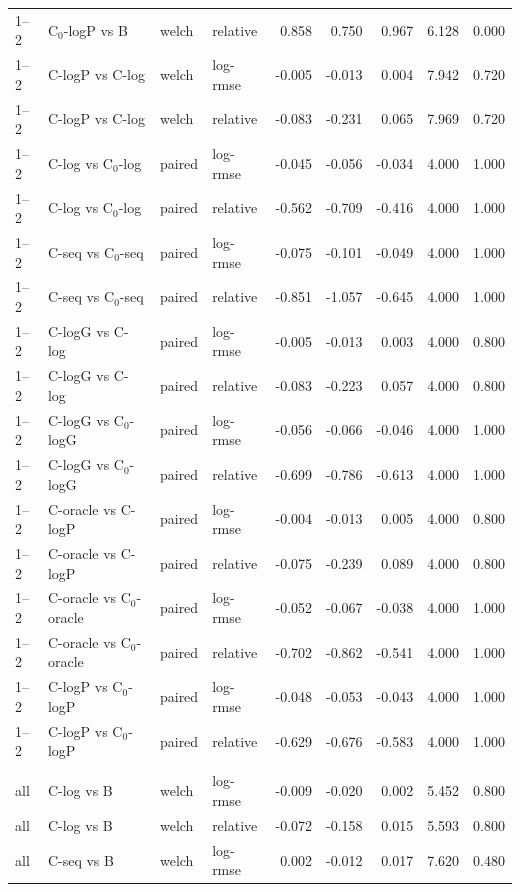 \begin{longtable}{llllrrrrr}
1–2 & C$_0$-logP vs B & welch & relative & 0.858 & 0.750 & 0.967 & 6.128 & 0.000 \\
1–2 & C-logP vs C-log & welch & log-rmse & -0.005 & -0.013 & 0.004 & 7.942 & 0.720 \\
1–2 & C-logP vs C-log & welch & relative & -0.083 & -0.231 & 0.065 & 7.969 & 0.720 \\
1–2 & C-log vs C$_0$-log & paired & log-rmse & -0.045 & -0.056 & -0.034 & 4.000 & 1.000 \\
1–2 & C-log vs C$_0$-log & paired & relative & -0.562 & -0.709 & -0.416 & 4.000 & 1.000 \\
1–2 & C-seq vs C$_0$-seq & paired & log-rmse & -0.075 & -0.101 & -0.049 & 4.000 & 1.000 \\
1–2 & C-seq vs C$_0$-seq & paired & relative & -0.851 & -1.057 & -0.645 & 4.000 & 1.000 \\
1–2 & C-logG vs C-log & paired & log-rmse & -0.005 & -0.013 & 0.003 & 4.000 & 0.800 \\
1–2 & C-logG vs C-log & paired & relative & -0.083 & -0.223 & 0.057 & 4.000 & 0.800 \\
1–2 & C-logG vs C$_0$-logG & paired & log-rmse & -0.056 & -0.066 & -0.046 & 4.000 & 1.000 \\
1–2 & C-logG vs C$_0$-logG & paired & relative & -0.699 & -0.786 & -0.613 & 4.000 & 1.000 \\
1–2 & C-oracle vs C-logP & paired & log-rmse & -0.004 & -0.013 & 0.005 & 4.000 & 0.800 \\
1–2 & C-oracle vs C-logP & paired & relative & -0.075 & -0.239 & 0.089 & 4.000 & 0.800 \\
1–2 & C-oracle vs C$_0$-oracle & paired & log-rmse & -0.052 & -0.067 & -0.038 & 4.000 & 1.000 \\
1–2 & C-oracle vs C$_0$-oracle & paired & relative & -0.702 & -0.862 & -0.541 & 4.000 & 1.000 \\
1–2 & C-logP vs C$_0$-logP & paired & log-rmse & -0.048 & -0.053 & -0.043 & 4.000 & 1.000 \\
1–2 & C-logP vs C$_0$-logP & paired & relative & -0.629 & -0.676 & -0.583 & 4.000 & 1.000 \\
\addlinespace
\multicolumn{9}{l}{\textit{RF}} \\
all & C-log vs B & welch & log-rmse & -0.009 & -0.020 & 0.002 & 5.452 & 0.800 \\
all & C-log vs B & welch & relative & -0.072 & -0.158 & 0.015 & 5.593 & 0.800 \\
all & C-seq vs B & welch & log-rmse & 0.002 & -0.012 & 0.017 & 7.620 & 0.480 \\

\end{longtable}
